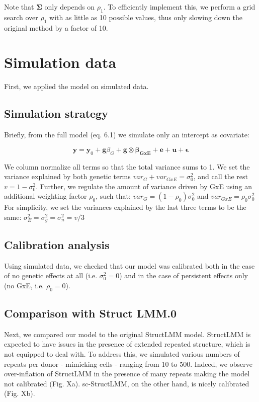 Note that $\boldsymbol{\Sigma}$ only depends on $\rho_1$. 
To efficiently implement this, we perform a grid search over $\rho_1$ with as little as 10 possible values, thus only slowing down the original method by a factor of 10.

\newpage

\section{Simulation data}

First, we applied the model on simulated data.

\subsection{Simulation strategy}
Briefly, from the full model (eq. 6.1) we simulate only an intercept as covariate:  

\begin{equation}
 \mathbf{y} = \mathbf{y}_0 + \mathbf{g}\beta_G + \mathbf{g} \otimes \boldsymbol{\beta_{GxE}} + \mathbf{e} + \mathbf{u} + \boldsymbol{\epsilon} 
\end{equation}

We column normalize all terms so that the total variance sums to 1.
We set the variance explained by both genetic terms $var_G+var_{GxE}=\sigma_0^2$, and call the rest $v = 1-\sigma_0^2$.
Further, we regulate the amount of variance driven by GxE using an additional weighting factor $\rho_0$, such that: $var_G = (1-\rho_0)\sigma_0^2$ and $var_{GxE} = \rho_0\sigma_0^2$
For simplicity, we set the variances explained by the last three terms to be the same:
$\sigma_E^2 = \sigma_g^2 = \sigma_n^2 = v/3$

\subsection{Calibration analysis}

Using simulated data, we checked that our model was calibrated both in the case of no genetic effects at all (i.e. $\sigma_0^2 = 0$) and in the case of persistent effects only (no GxE, i.e. $\rho_0 = 0$).

\subsection{Comparison with Struct LMM.0}

Next, we compared our model to the original StructLMM model.
StructLMM is expected to have issues in the presence of extended repeated structure, which is not equipped to deal with.
To address this, we simulated various numbers of repeats per donor - mimicking cells -  ranging from 10 to 500.
Indeed, we observe over-inflation of StructLMM in the presence of many repeats making the model not calibrated (Fig. Xa).
sc-StructLMM, on the other hand, is nicely calibrated (Fig. Xb).

